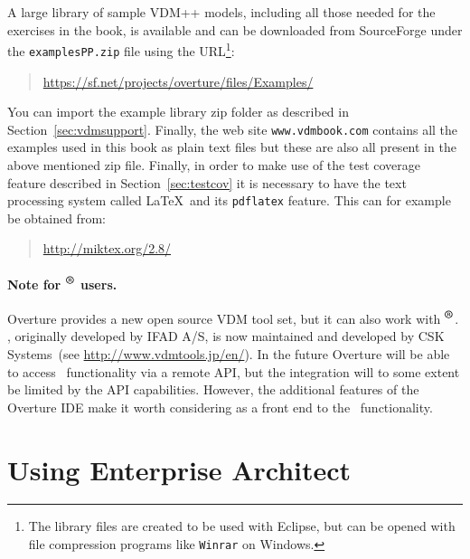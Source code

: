 A large library of sample VDM++ models, including all those needed
for the exercises in the book, is available and can be downloaded from
SourceForge under the \texttt{examplesPP.zip} file using the
URL\footnote{The library files are created to be used with Eclipse,
  but can be opened with file compression programs like \texttt{Winrar} on
  Windows.}:
\begin{quote}
\url{https://sf.net/projects/overture/files/Examples/}
\end{quote}
You can import the example library zip folder as described in
Section~\ref{sec:vdmsupport}.  Finally, the web site
\texttt{www.vdmbook.com} contains all the examples used in this book
as plain text files but these are also all present in the above
mentioned zip file. Finally, in order to make use of the
test coverage feature described in Section~\ref{sec:testcov} it is
necessary to have the text processing system called \LaTeX\ and its
\texttt{pdflatex} feature. This can for example be obtained from:
\begin{quote}
\url{http://miktex.org/2.8/}
\end{quote}


\paragraph{Note for \vdmtools$^{\mbox{\small\textbf{{\textregistered}}}}$ users.} 
Overture provides a new open source VDM tool set, but it can
also work with
\vdmtools$^{\mbox{\small\textbf{{\textregistered}}}}$. \vdmtools, originally developed by IFAD A/S, is now
maintained and developed by CSK Systems~(see
\url{http://www.vdmtools.jp/en/}). In the future Overture will be able
to access
\vdmtools\ functionality via a remote API, but the integration will to
some extent be limited by the API capabilities. However, the additional
features of the Overture IDE make it worth considering as a front end
to the \vdmtools\ functionality.



 
\section{Using Enterprise Architect}\label{sec:Rose}

